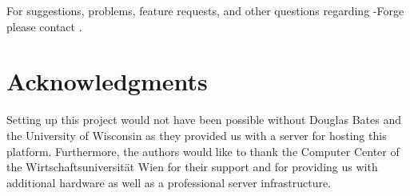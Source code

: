 For suggestions, problems, feature requests, and other questions regarding
\R{}-Forge please contact .

\section{Acknowledgments}

Setting up this project would not have been possible without Douglas
Bates and the University of Wisconsin as they provided us with a
server for hosting this platform. Furthermore, 
the authors would like to thank the Computer Center 
of the Wirtschaftsuniversit\"at Wien for
their support and for providing us with additional hardware as well as a
professional server infrastructure.


